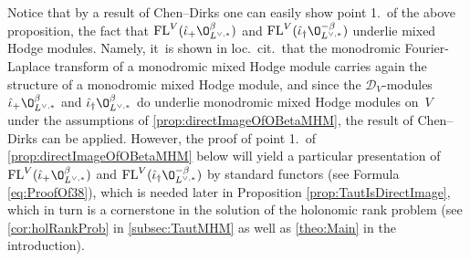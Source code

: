 \documentclass[JEP,XML,SOM,Unicode,published]{cedram}
\newcommand{\cD}{\mathscr{D}}
\DeclareMathOperator{\FL}{\textup{FL}}
\begin{document}
\begin{rmk}
Notice that by a result of Chen--Dirks \cite[Th.\,1.4]{CD23} one can easily show point 1.\ of the above proposition, \ie the fact that $\FL^V(\hat\iota_+ \O_{L^{\vee,*}}^\beta)$ and $\FL^V(\hat\iota_\dag \O_{L^{\vee,*}}^{-\beta})$
underlie mixed Hodge modules. Namely, it~is shown in loc.\ cit.\ that the monodromic Fourier-Laplace transform of a monodromic mixed Hodge module carries again the structure of a monodromic mixed Hodge module, and since the $\cD_V$\nobreakdash-mod\-ules $\hat\iota_+ \O_{L^{\vee,*}}^\beta$ and $\hat\iota_\dag \O_{L^{\vee,*}}^\beta$ do underlie monodromic mixed Hodge modules on~$V$ under the assumptions of \cref{prop:directImageOfOBetaMHM}, the result of Chen--Dirks can be applied. However, the proof of point 1.\ of \cref{prop:directImageOfOBetaMHM} below will yield a particular presentation of $\FL^V(\hat\iota_+ \O_{L^{\vee,*}}^\beta)$ and $\FL^V(\hat\iota_\dag \O_{L^{\vee,*}}^{-\beta})$ by standard functors (see Formula \eqref{eq:ProofOf38}), which
is needed later in Proposition \ref{prop:TautIsDirectImage}, which in turn is a cornerstone in the solution of the holonomic rank problem (see \cref{cor:holRankProb} in \cref{subsec:TautMHM} as well as \cref{theo:Main} in the introduction).
\end{rmk}
\end{document}

